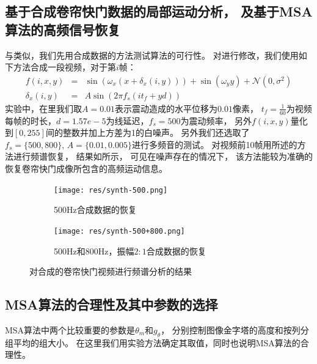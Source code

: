 \subsection{基于合成卷帘快门数据的局部运动分析，
    及基于MSA算法的高频信号恢复\label{sec:synth-local}}
与类似，我们先用合成数据的方法测试算法的可行性。
对进行修改，我们使用如下方法合成一段视频，对于第$i$帧：
\begin{eqnarray}
    f(i, x, y) &=& \sin(\omega_x (x + \delta_x(i, y))) + \sin(\omega_y y) + 
    \mathcal{N}(0, \sigma^2) \\
    \delta_x(i, y) &=& A\sin(2\pi f_s(it_f+yd))
    \label{eqn:synth-local}
\end{eqnarray}
实验中，在里我们取$A=0.01$表示震动造成的水平位移为$0.01$像素，
$t_f=\frac{1}{60}$为视频每帧的时长，$d=1.57e-5$为线延迟，$f_s=500$为震动频率，
另外$f(i, x, y)$量化到$[0, 255]$间的整数并加上方差为1的白噪声。
另外我们还选取了$f_s=\{500, 800\},\,A=\{0.01, 0.005\}$进行多频音的测试。
对视频前10帧用所述的方法进行频谱恢复，
结果如所示，
可见在噪声存在的情况下，
该方法能较为准确的恢复卷帘快门成像所包含的高频运动信息。
\begin{figure}[h!]\begin{center}
    \begin{subfigure}[b]{.5\figwidth}
        \texttt{[image: res/synth-500.png]}
        \caption{500Hz合成数据的恢复}
    \end{subfigure}
    \begin{subfigure}[b]{.5\figwidth}
        \texttt{[image: res/synth-500+800.png]}
        \caption{500Hz和800Hz，振幅$2:1$合成数据的恢复}
        \label{fig:synth:500+800}
    \end{subfigure}
    \caption{对合成的卷帘快门视频进行频谱分析的结果}
    \label{fig:synth-local}
\end{center}\end{figure}

\subsection{MSA算法的合理性及其中参数的选择}
MSA算法中两个比较重要的参数是$\theta_m$和$g_\theta$，
分别控制图像金字塔的高度和按列分组平均的组大小。
在这里我们用实验方法确定其取值，同时也说明MSA算法的合理性。

